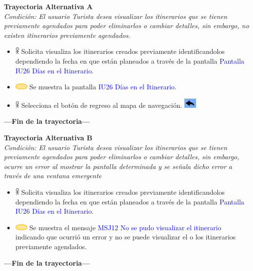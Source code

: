 \textbf{Trayectoria Alternativa A}\\
\textit{Condición: El usuario Turista desea visualizar los itinerarios que se tienen previamente agendados para poder eliminarlos o cambiar detalles, sin embargo, no existen itinerarios previamente agendados.}
\begin{itemize}
     \item \includegraphics[width=0.0150\textwidth]{Figuras/persona.png} Solicita visualiza los itinerarios creados previamente identificandolos dependiendo la fecha en que están planeados a través de la pantalla {\textcolor{blue}{Pantalla IU26 Días en el Itinerario}}.
    \item \includegraphics[width=0.0500\textwidth]{Figuras/sistema.png} Se muestra la pantalla {\textcolor{blue}{IU26 Días en el Itinerario}}.
    \item \includegraphics[width=0.0150\textwidth]{Figuras/persona.png} Selecciona el botón de regreso al mapa de navegación.  \includegraphics[width=0.05\textwidth]{ComponentesCU/back.PNG}     
\end{itemize}
\textbf{---Fin de la trayectoria---}

\textbf{Trayectoria Alternativa B}\\
\textit{Condición: El usuario Turista desea visualizar los itinerarios que se tienen previamente agendados para poder eliminarlos o cambiar detalles, sin embargo, ocurre un error al mostrar la pantalla determinada y se señala dicho error a través de una ventana emergente}
\begin{itemize}
     \item \includegraphics[width=0.0150\textwidth]{Figuras/persona.png} Solicita visualiza los itinerarios creados previamente identificandolos dependiendo la fecha en que están planeados a través de la pantalla {\textcolor{blue}{Pantalla IU26 Días en el Itinerario}}.
    \item \includegraphics[width=0.0500\textwidth]{Figuras/sistema.png} Se muestra el mensaje {\textcolor{blue}{MSJ12 No se pudo visualizar el itinerario}} indicando que ocurrió un error y no se puede visualizar el o los itinerarios previamente agendados.   
\end{itemize}
\textbf{---Fin de la trayectoria---}
\newpage

